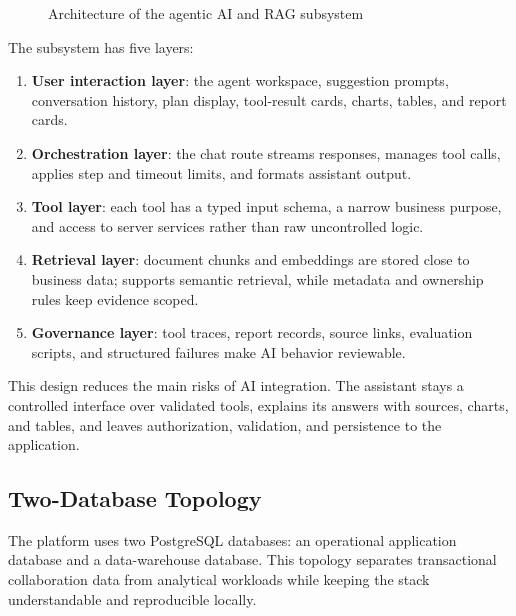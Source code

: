 \begin{figure}[htbp]
  \centering
  \caption{Architecture of the agentic AI and RAG subsystem}
  \label{fig:ai-subsystem-architecture}
\end{figure}
The subsystem has five layers:

\begin{enumerate}
  \item \textbf{User interaction layer}: the agent workspace, suggestion prompts, conversation history, plan display, tool-result cards, charts, tables, and report cards.
  \item \textbf{Orchestration layer}: the chat route streams responses, manages tool calls, applies step and timeout limits, and formats assistant output.
  \item \textbf{Tool layer}: each tool has a typed input schema, a narrow business purpose, and access to server services rather than raw uncontrolled logic.
  \item \textbf{Retrieval layer}: document chunks and embeddings are stored close to business data;   supports semantic retrieval, while metadata and ownership rules keep evidence scoped.
  \item \textbf{Governance layer}: tool traces, report records, source links, evaluation scripts, and structured failures make AI behavior reviewable.
\end{enumerate}
This design reduces the main risks of AI integration. The assistant stays a controlled interface over validated tools, explains its answers with sources, charts, and tables, and leaves authorization, validation, and persistence to the application.
\subsection{Two-Database Topology}
The platform uses two PostgreSQL databases: an operational application database and a data-warehouse database. This topology separates transactional collaboration data from analytical workloads while keeping the stack understandable and reproducible locally.

